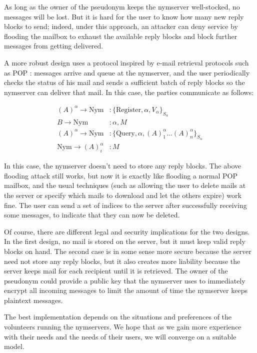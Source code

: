 \documentclass[final,inpress,inline]{ieee}
\begin{document}
As long
as the owner of the pseudonym keeps the nymserver well-stocked, no
messages will be lost.  But it is hard for the user to know how many
new reply blocks to send; indeed, under this approach, an attacker can
deny service by flooding the mailbox to exhaust the available
reply blocks and block further messages from getting delivered.

A more robust design uses a protocol inspired by e-mail retrieval
protocols such as POP \cite{POP3}:
messages arrive and queue at the nymserver, and the user periodically
checks the status of his mail and sends a sufficient batch of reply
blocks so the nymserver can deliver that mail.  In this case, the parties
communicate as follows:

\begin{equation}
\begin{aligned}
(A)^\alpha \rightarrow \mathrm{Nym}&: \{\mathrm{Register} , \alpha, V_{\alpha}\}_{S_{\alpha}}\\
B \rightarrow \mathrm{Nym}&: \alpha, M \\
(A)^\alpha \rightarrow \mathrm{Nym}&: \{\mathrm{Query} ,\alpha, (A)^\alpha_1 \dots
(A)^\alpha_n\}_{S_{\alpha}} \\
\mathrm{Nym} \rightarrow (A)^\alpha_i&: M
\end{aligned}
\end{equation}

In this case, the nymserver doesn't need to store any reply blocks.
The above flooding attack still works, but now it is exactly
like flooding a normal POP mailbox, and the usual techniques (such as
allowing the user to delete mails at the server or specify which mails to
download and let the others expire) work fine. The user can send a set
of indices to the server after successfully receiving
some messages, to indicate that they can now be deleted.

Of course, there are different legal and security implications for the two
designs. In the first design, no mail is stored on the server, but it must
keep valid reply blocks on hand. The second case is in some sense more
secure because the server need not store any reply blocks, but it also
creates more liability because the server keeps mail for each recipient
until it is retrieved. The owner of the pseudonym could provide a public
key that the nymserver uses to immediately encrypt all incoming messages
to limit the amount of time the nymserver keeps plaintext messages.

The best implementation depends on the situations and preferences of the
volunteers running the nymservers.  We hope that as we gain more experience
with their needs and the needs of their users, we will converge on a suitable
model.
\end{document}

